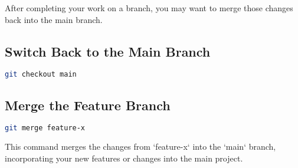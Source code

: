 \documentclass{article}
\begin{document}
After completing your work on a branch, you may want to merge those changes back into the main branch.

\subsection{Switch Back to the Main Branch}

\begin{lstlisting}[language=bash]
git checkout main
\end{lstlisting}

\subsection{Merge the Feature Branch}

\begin{lstlisting}[language=bash]
git merge feature-x
\end{lstlisting}

This command merges the changes from `feature-x` into the `main` branch, incorporating your new features or changes into the main project.
\end{document}

